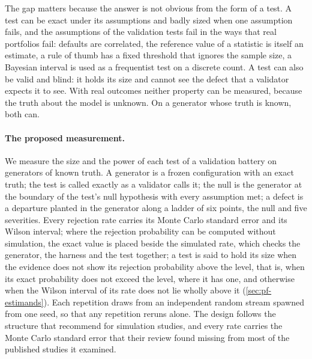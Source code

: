 The gap matters because the answer is not obvious from the form of a test.
A test can be exact under its assumptions and badly sized when one assumption fails, and the assumptions of the validation tests fail in the ways that real portfolios fail: defaults are correlated, the reference value of a statistic is itself an estimate, a rule of thumb has a fixed threshold that ignores the sample size, a Bayesian interval is used as a frequentist test on a discrete count.
A test can also be valid and blind: it holds its size and cannot see the defect that a validator expects it to see.
With real outcomes neither property can be measured, because the truth about the model is unknown.
On a generator whose truth is known, both can.

\paragraph{The proposed measurement.}
We measure the size and the power of each test of a validation battery on generators of known truth.
A generator is a frozen configuration with an exact truth; the test is called exactly as a validator calls it; the null is the generator at the boundary of the test's null hypothesis with every assumption met; a defect is a departure planted in the generator along a ladder of six points, the null and five severities.
Every rejection rate carries its Monte Carlo standard error and its Wilson interval; where the rejection probability can be computed without simulation, the exact value is placed beside the simulated rate, which checks the generator, the harness and the test together; a test is said to hold its size when the evidence does not show its rejection probability above the level, that is, when its exact probability does not exceed the level, where it has one, and otherwise when the Wilson interval of its rate does not lie wholly above it (\cref{sec:pf-estimands}).
Each repetition draws from an independent random stream spawned from one seed, so that any repetition reruns alone.
The design follows the structure that \citet{morris2019} recommend for simulation studies, and every rate carries the Monte Carlo standard error that their review found missing from most of the published studies it examined.

